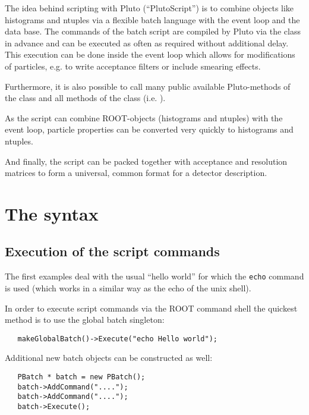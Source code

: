 
\manf

The idea behind scripting with Pluto (``PlutoScript'') is to combine
objects like histograms and ntuples via a flexible batch language with
the event loop and the data base. The commands of the batch script are
compiled by Pluto via the class  in advance and can be executed as often as
required without additional delay.  This execution can be done inside the
event loop which allows for modifications of particles, e.g.  to
write acceptance filters or include smearing effects. 

Furthermore, it is also possible to call many public available
Pluto-methods of the  class and all methods of the class
 (i.e. ).


As the script can combine ROOT-objects (histograms and ntuples) with
the event loop, particle properties can be converted very quickly to
histograms and ntuples.

And finally, the script can be packed together with acceptance and
resolution matrices to form a universal, common format for
a detector description.

\mend

\section{The syntax}


\subsection{Execution of the script commands}
\label{sec:execution}

The first examples deal with the usual ``hello world'' for which the
{\tt echo} command is used (which works in a similar way as the echo of
the unix shell).

In order to execute script commands via the ROOT command shell the
quickest method is to use the global batch singleton:

\begin{verbatim}
   makeGlobalBatch()->Execute("echo Hello world");
\end{verbatim}

Additional new batch objects can be constructed as well:

\begin{verbatim}
   PBatch * batch = new PBatch();
   batch->AddCommand("....");    
   batch->AddCommand("....");
   batch->Execute();
\end{verbatim}

